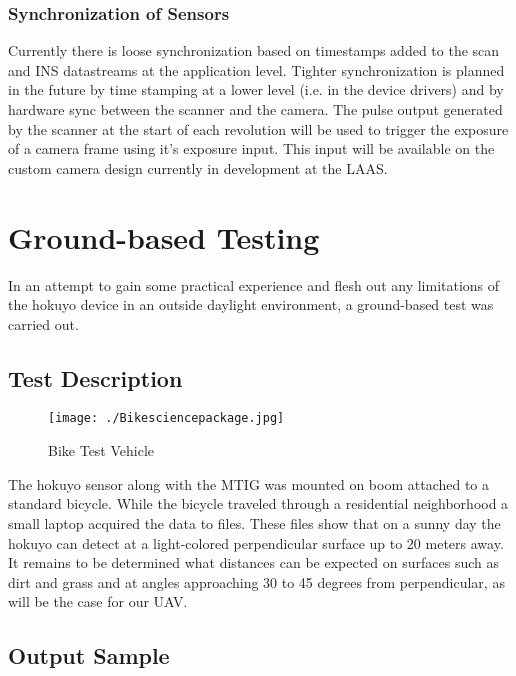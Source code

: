 \documentclass[a4paper,11pt]{report}
\begin{document}
\subsection{Synchronization of Sensors}
 
Currently there is loose synchronization based on timestamps added to the scan and INS datastreams at the application level. Tighter synchronization is planned in the future by time stamping at a lower level (i.e. in the device drivers) and by hardware sync between the scanner and the camera. The pulse output generated by the scanner at the start of each revolution will be used to trigger the exposure of a camera frame using it's exposure input. This input will be available on the custom camera design currently in development at the LAAS.

\chapter{Ground-based Testing}

In an attempt to gain some practical experience and flesh out any limitations of the hokuyo device in an outside daylight environment, a ground-based test was carried out. 

\section{Test Description}

\begin{figure}[h]
 \centering
 \texttt{[image: ./Bikesciencepackage.jpg]}
 \caption{Bike Test Vehicle}
 \label{fig:bike}
\end{figure}

The hokuyo sensor along with the MTIG was mounted on boom attached to a standard bicycle. While the bicycle traveled through a residential neighborhood a small laptop acquired the data to files. These files show that on a sunny day the hokuyo can detect at a light-colored perpendicular surface up to 20 meters away. It remains to be determined what distances can be expected on surfaces such as dirt and grass and at angles approaching 30 to 45 degrees from perpendicular, as will be the case for our UAV.

\section{Output Sample}
\end{document}
